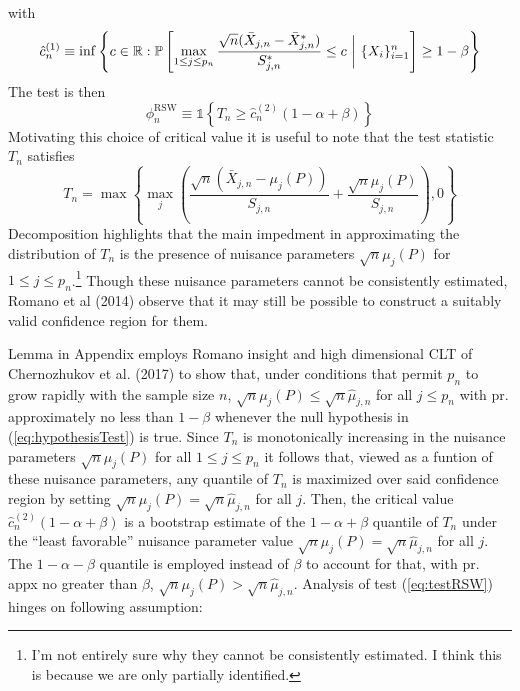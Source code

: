 with 
\[\hat{c}_n^{(1)} \equiv \inf\left\{ c \in \mathbb{R}: \mathbb{P}\left[\max_{1\leq j\leq p_n} \frac{\sqrt{n}(\bar{X}_{j,n} - \bar{X}_{j,n}^*)}{S_{j,n}^*} \leq c \hbox{ }\bigg|\hbox{ }  \{X_i\}_{i=1}^n \right] \geq 1- \beta \right\}\]
The test is then
\begin{equation}
	\label{eq:testRSW}
	\phi_n^{\text{RSW}} \equiv \mathds{1}\left\{T_n \geq \hat{c}_n^{(2)}(1-\alpha+\beta)\right\}
\end{equation}
Motivating this choice of critical value it is useful to note that the test statistic $T_n$ satisfies
\begin{equation}
	\label{eq:decomp}
	T_n = \max\left\{\max_j \left(\frac{\sqrt{n}(\bar{X}_{j,n} - \mu_j(P))}{S_{j,n}} + \frac{\sqrt{n}\mu_{j}(P)}{S_{j,n}} \right), 0 \right\}
\end{equation}
Decomposition highlights that the main impedment in approximating the distribution of $T_n$ is the presence of nuisance parameters $\sqrt{n}\mu_j(P)$ for $1\leq j \leq p_n$.\footnote{I'm not entirely sure why they cannot be consistently estimated. I think this is because we are only partially identified.} Though these nuisance parameters cannot be consistently estimated, Romano et al (2014) observe that it may still be possible to construct a suitably valid confidence region for them. 

Lemma in Appendix employs Romano insight and high dimensional CLT of Chernozhukov et al. (2017) to show that, under conditions that permit $p_n$ to grow rapidly with the sample size $n$, $\sqrt{n}\mu_j(P) \leq \sqrt{n}\hat{\mu}_{j,n}$ for all $j \leq p_n$ with pr. approximately no less than $1-\beta$ whenever the null hypothesis in (\ref{eq:hypothesisTest}) is true. Since $T_n$ is monotonically increasing in the nuisance parameters $\sqrt{n}\mu_j(P)$ for all $1\leq j \leq p_n$ it follows that, viewed as a funtion of these nuisance parameters, any quantile of $T_n$ is maximized over said confidence region by setting $\sqrt{n}\mu_j(P) = \sqrt{n}\hat{\mu}_{j,n}$ for all $j$. Then, the critical value $\hat{c}_n^{(2)}(1-\alpha + \beta)$ is a bootstrap estimate of the $1-\alpha + \beta$ quantile of $T_n$ under the ``least favorable'' nuisance parameter value $\sqrt{n}\mu_j(P) = \sqrt{n}\hat{\mu}_{j,n}$ for all $j$. The $1-\alpha-\beta$ quantile is employed instead of $\beta$ to account for that, with pr. appx no greater than $\beta$, $\sqrt{n}\mu_j(P)>\sqrt{n}\hat{\mu}_{j,n}$. Analysis of test (\ref{eq:testRSW}) hinges on following assumption:

